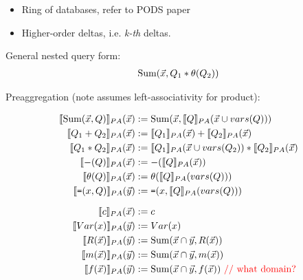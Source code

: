 \begin{itemize}
  \item Ring of databases, refer to PODS paper
  \item Higher-order deltas, i.e. \textit{k-th} deltas.
\end{itemize}


\noindent{}

\noindent{}

\comment{
\begin{align*}
\calcsum(\phi[][\vec{x}] *
(\calcsum(\ldots)[\vec{x}][] * \calceq_\phi[y][] * (\psi[y][]))) \\
\end{align*}
}

\noindent General nested query form:
\begin{align*}
\mbox{Sum}(\vec{x}, Q_1 * \theta(Q_2))
\end{align*}

\def \pa#1#2{\llbracket #1 \rrbracket_{PA}(#2)}

\noindent Preaggregation (note assumes left-associativity for product):

\begin{align*}
\pa{\calcsum(\vec{x}, \qq)}{\vec{x}} & :=
    \calcsum(\vec{x}, \pa{\qq}{\vec{x} \cup vars(\qq)})
\\
\pa{\qqa + \qqb}{\vec{x}} & := \pa{\qqa}{\vec{x}} + \pa{\qqb}{\vec{x}}
\\
\pa{\qqa * \qqb}{\vec{x}} & :=
    \pa{\qqa}{\vec{x} \cup vars(\qqb)} * \pa{\qqb}{\vec{x}}
\\
\pa{-(\qq)}{\vec{x}} & := -(\pa{\qq}{\vec{x}})
\\
\pa{\theta(\qq)}{\vec{x}} & := \theta(\pa{\qq}{vars(\qq)})
\\
\pa{\calceq(x,\qq)}{\vec{y}} & := \calceq(x, \pa{\qq}{vars(Q)})
\\[1.5ex]
\pa{c}{\vec{x}} & := c
\\
\pa{Var(x)}{\vec{y}} & := Var(x)
\\
\pa{R(\vec{x})}{\vec{y}} & := \calcsum(\vec{x} \cap \vec{y}, R(\vec{x}))
\\
\pa{m(\vec{x})}{\vec{y}} & := \calcsum(\vec{x} \cap \vec{y}, m(\vec{x}))
\\
\pa{f(\vec{x})}{\vec{y}} & := \calcsum(\vec{x} \cap \vec{y}, f(\vec{x}))
   \mbox{  \todo{// what domain?}}
\end{align*}


